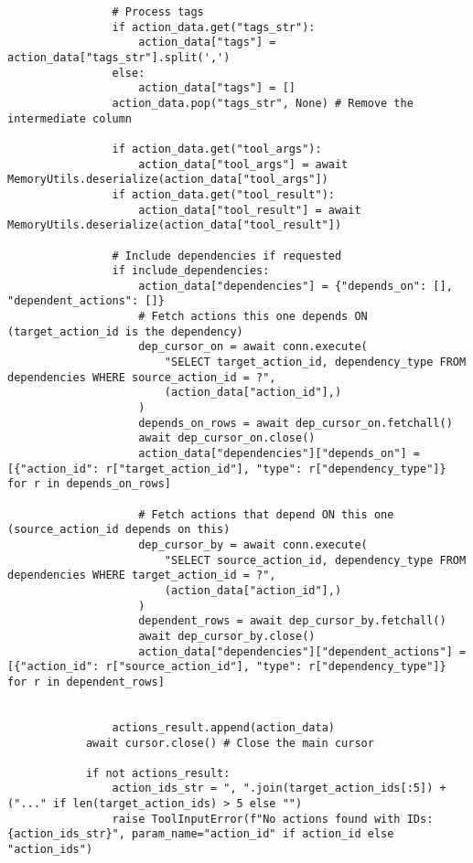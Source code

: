 \documentclass[12pt,a4paper]{article}
\begin{document}
\begin{pageablecode}
\begin{verbatim}
                # Process tags
                if action_data.get("tags_str"):
                    action_data["tags"] = action_data["tags_str"].split(',')
                else:
                    action_data["tags"] = []
                action_data.pop("tags_str", None) # Remove the intermediate column

                if action_data.get("tool_args"):
                    action_data["tool_args"] = await MemoryUtils.deserialize(action_data["tool_args"])
                if action_data.get("tool_result"):
                    action_data["tool_result"] = await MemoryUtils.deserialize(action_data["tool_result"])

                # Include dependencies if requested
                if include_dependencies:
                    action_data["dependencies"] = {"depends_on": [], "dependent_actions": []}
                    # Fetch actions this one depends ON (target_action_id is the dependency)
                    dep_cursor_on = await conn.execute(
                        "SELECT target_action_id, dependency_type FROM dependencies WHERE source_action_id = ?",
                        (action_data["action_id"],)
                    )
                    depends_on_rows = await dep_cursor_on.fetchall()
                    await dep_cursor_on.close()
                    action_data["dependencies"]["depends_on"] = [{"action_id": r["target_action_id"], "type": r["dependency_type"]} for r in depends_on_rows]

                    # Fetch actions that depend ON this one (source_action_id depends on this)
                    dep_cursor_by = await conn.execute(
                        "SELECT source_action_id, dependency_type FROM dependencies WHERE target_action_id = ?",
                        (action_data["action_id"],)
                    )
                    dependent_rows = await dep_cursor_by.fetchall()
                    await dep_cursor_by.close()
                    action_data["dependencies"]["dependent_actions"] = [{"action_id": r["source_action_id"], "type": r["dependency_type"]} for r in dependent_rows]


                actions_result.append(action_data)
            await cursor.close() # Close the main cursor

            if not actions_result:
                action_ids_str = ", ".join(target_action_ids[:5]) + ("..." if len(target_action_ids) > 5 else "")
                raise ToolInputError(f"No actions found with IDs: {action_ids_str}", param_name="action_id" if action_id else "action_ids")


\end{verbatim}
\end{pageablecode}
\end{document}
